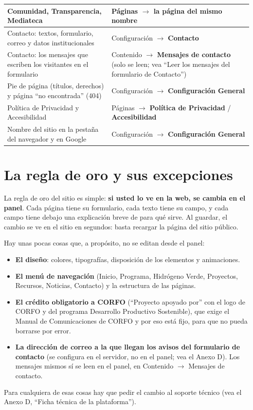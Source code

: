 \documentclass[11pt,letterpaper]{report}
\begin{document}
\begin{longtable}{>{\raggedright\arraybackslash}p{}>{\raggedright\arraybackslash}p{}}
Comunidad, Transparencia, Mediateca & Páginas $\rightarrow$ la página del mismo nombre \\ \midrule
\rowcolor{filaalt}Contacto: textos, formulario, correo y datos institucionales & Configuración $\rightarrow$ \textbf{Contacto} \\ \midrule
Contacto: los mensajes que escriben los visitantes en el formulario & Contenido $\rightarrow$ \textbf{Mensajes de contacto} (solo se leen; vea “Leer los mensajes del formulario de Contacto”) \\ \midrule
\rowcolor{filaalt}Pie de página (títulos, derechos) y página “no encontrada” (404) & Configuración $\rightarrow$ \textbf{Configuración General} \\ \midrule
Política de Privacidad y Accesibilidad & Páginas $\rightarrow$ \textbf{Política de Privacidad} / \textbf{Accesibilidad} \\ \midrule
\rowcolor{filaalt}Nombre del sitio en la pestaña del navegador y en Google & Configuración $\rightarrow$ \textbf{Configuración General} \\ \bottomrule
\end{longtable}
\section{La regla de oro y sus excepciones}
La regla de oro del sitio es simple: \textbf{si usted lo ve en la web, se cambia en el panel}. Cada página tiene su formulario, cada texto tiene su campo, y cada campo tiene debajo una explicación breve de para qué sirve. Al guardar, el cambio se ve en el sitio en segundos: basta recargar la página del sitio público.

Hay unas pocas cosas que, a propósito, no se editan desde el panel:

\begin{itemize}
  \item \textbf{El diseño}: colores, tipografías, disposición de los elementos y animaciones.
  \item \textbf{El menú de navegación} (Inicio, Programa, Hidrógeno Verde, Proyectos, Recursos, Noticias, Contacto) y la estructura de las páginas.
  \item \textbf{El crédito obligatorio a CORFO} (“Proyecto apoyado por” con el logo de CORFO y del programa Desarrollo Productivo Sostenible), que exige el Manual de Comunicaciones de CORFO y por eso está fijo, para que no pueda borrarse por error.
  \item \textbf{La dirección de correo a la que llegan los avisos del formulario de contacto} (se configura en el servidor, no en el panel; vea el Anexo D). Los mensajes mismos sí se leen en el panel, en Contenido $\rightarrow$ Mensajes de contacto.
\end{itemize}
Para cualquiera de esas cosas hay que pedir el cambio al soporte técnico (vea el Anexo D, “Ficha técnica de la plataforma”).
\end{document}
